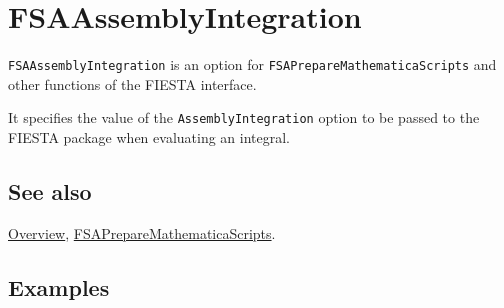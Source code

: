 \documentclass[../FeynHelpersManual.tex]{subfiles}
\begin{document}
\hypertarget{fsaassemblyintegration}{
\section{FSAAssemblyIntegration}\label{fsaassemblyintegration}}

\texttt{FSAAssemblyIntegration} is an option for
\texttt{FSAPrepareMathematicaScripts} and other functions of the FIESTA
interface.

It specifies the value of the \texttt{AssemblyIntegration} option to be
passed to the FIESTA package when evaluating an integral.

\subsection{See also}

\hyperlink{toc}{Overview},
\hyperlink{fsapreparemathematicascripts}{FSAPrepareMathematicaScripts}.

\subsection{Examples}
\end{document}
